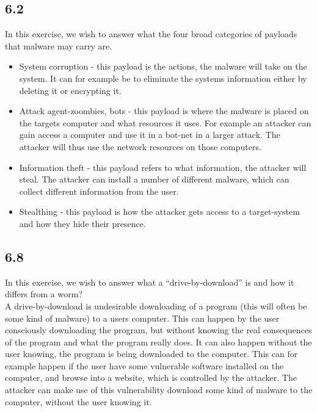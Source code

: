 \documentclass{article}
\begin{document}
\subsection{6.2}
In this exercise, we wish to answer what the four broad categories of payloads that malware may carry are. \\ 

\begin{itemize}
    \item System corruption - this payload is the actions, the malware will take on the system. It can for example be to eliminate the systems information either by deleting it or encrypting it.  
    
    \item Attack agent-zoombies, bots - this payload is where the malware is placed on the targets computer and what resources it uses. For example an attacker can gain access a computer and use it in a bot-net in a larger attack. The attacker will thus use the network resources on those computers. 
    
    \item Information theft - this payload refers to what information, the attacker will steal. The attacker can install a number of different malware, which can collect different information from the user.
    
    \item Stealthing - this payload is how the attacker gets access to a target-system and how they hide their presence. 
\end{itemize}


\subsection{6.8}
In this exercise, we wish to answer what a “drive-by-download” is and how it differs from a worm?\\

A drive-by-download is undesirable downloading of a program (this will often be some kind of malware) to a users computer. This can happen by the user consciously downloading the program, but without knowing the real consequences of the program and what the program really does. It can also happen without the user knowing, the program is being downloaded to the computer. This can for example happen if the user have some vulnerable software installed on the computer, and browse into a website, which is controlled by the attacker. The attacker can make use of this vulnerability download some kind of malware to the computer, without the user knowing it. 
\end{document}
